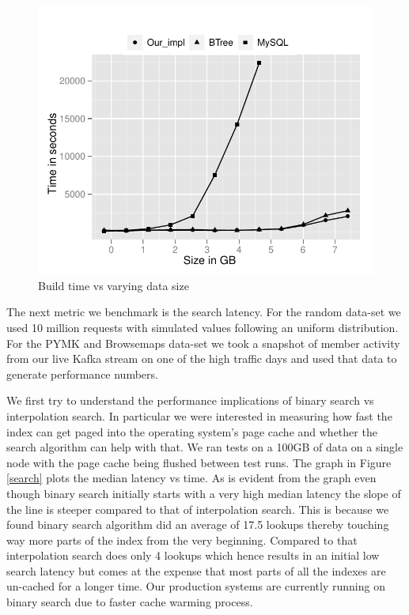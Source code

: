 \begin{figure}
  \centering
    \includegraphics[scale=0.55]{images/build.pdf}
  \caption{Build time vs varying data size}
  \label{build}
\end{figure}

The next metric we benchmark is the search latency. For the random data-set we used 10 million requests with simulated values following an uniform distribution. For the PYMK and Browsemaps data-set we took a snapshot of member activity from our live Kafka stream on one of the high traffic days and used that data to generate performance numbers.

We first try to understand the performance implications of binary search vs interpolation search. In particular we were interested in measuring how fast the index can get paged into the operating system's page cache and whether the search algorithm can help with that. We ran tests on a 100GB of data on a single node with the page cache being flushed between test runs. The graph in Figure \ref{search} plots the median latency vs time. As is evident from the graph even though binary search initially starts with a very high median latency the slope of the line is steeper compared to that of interpolation search. This is because we found binary search algorithm did an average of 17.5 lookups thereby touching way more parts of the index from the very beginning. Compared to that interpolation search does only 4 lookups which hence results in an initial low search latency but comes at the expense that most parts of all the indexes are un-cached for a longer time. Our production systems are currently running on binary search due to faster cache warming process.  

